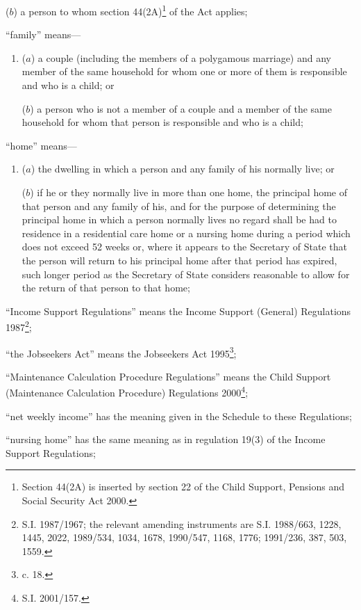 \documentclass[12pt,a4paper]{article}
\begin{document}
\begin{enumerate}
\begin{enumerate}
($b$) 
a person to whom section 44(2A)\footnote{Section 44(2A) is inserted by section 22 of the Child Support, Pensions and Social Security Act 2000.} of the Act applies;
\end{enumerate}

“family” means—
\begin{enumerate}\item[]
($a$) 
a couple (including the members of a polygamous marriage) and any member of the same household for whom one or more of them is responsible and who is a child; or

($b$) 
a person who is not a member of a couple and a member of the same household for whom that person is responsible and who is a child;
\end{enumerate}

“home” means—
\begin{enumerate}\item[]
($a$) 
the dwelling in which a person and any family of his normally live; or

($b$) 
if he or they normally live in more than one home, the principal home of that person and any family of his, and for the purpose of determining the principal home in which a person normally lives no regard shall be had to residence in a residential care home or a nursing home during a period which does not exceed 52 weeks or, where it appears to the Secretary of State that the person will return to his principal home after that period has expired, such longer period as the Secretary of State considers reasonable to allow for the return of that person to that home;
\end{enumerate}

“Income Support Regulations” means the Income Support (General) Regulations 1987\footnote{\frenchspacing S.I. 1987/1967; the relevant amending instruments are S.I. 1988/663, 1228, 1445, 2022, 1989/534, 1034, 1678, 1990/547, 1168, 1776; 1991/236, 387, 503, 1559.};

“the Jobseekers Act” means the Jobseekers Act 1995\footnote{ c. 18.};

“Maintenance Calculation Procedure Regulations” means the Child Support (Maintenance Calculation Procedure) Regulations 2000\footnote{\frenchspacing S.I. 2001/157.};

“net weekly income” has the meaning given in the Schedule to these Regulations;

“nursing home” has the same meaning as in regulation 19(3) of the Income Support Regulations;


\end{enumerate}
\end{document}
